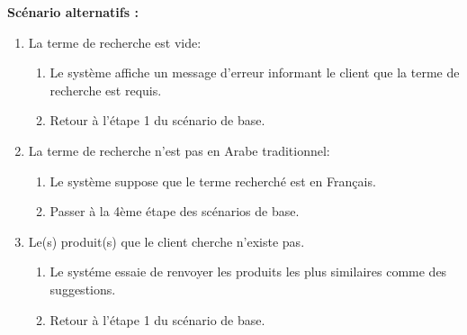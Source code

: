 \newpage
\textbf{Scénario alternatifs : }
\begin{enumerate}
	\item La terme de recherche est vide:
	      \begin{enumerate}
		      \item Le système affiche un message d'erreur informant le client que la terme de recherche est requis.
		      \item Retour à l'étape 1 du scénario de base.
	      \end{enumerate}
	\item La terme de recherche n'est pas en Arabe traditionnel:
	      \begin{enumerate}
		      \item Le système suppose que le terme recherché est en Français.
		      \item Passer à la 4ème étape des scénarios de base.
	      \end{enumerate}
	\item Le(s) produit(s) que le client cherche n'existe pas.
	      \begin{enumerate}
		      \item Le systéme essaie de renvoyer les produits les plus similaires comme des suggestions.
		      \item Retour à l'étape 1 du scénario de base.
	      \end{enumerate}
\end{enumerate}


